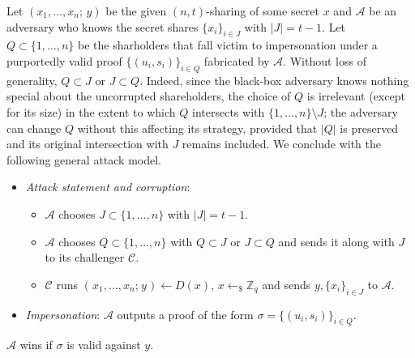 \documentclass[10pt, psamsfonts, reqno]{amsart}
\theoremstyle{definition}
\theoremstyle{remark}
\numberwithin{equation}{section}
\begin{document}
Let $(x_1, \dots, x_n;\hspace{2pt} y)$
be the given $(n, t)$-sharing of some secret $x$
and $\mathcal{A}$ be an adversary who knows
the secret shares
$\{x_i\}_{i \in J}$ with $|J| = t-1$.
Let $Q \subset \{1, \dots, n\}$ be the
sharholders that fall victim to impersonation
under a purportedly valid proof $\{(u_i, s_i)\}_{i \in Q}$
fabricated by $\mathcal{A}$.
Without loss of generality,
$Q \subset J$ or $J \subset Q$.
Indeed, since the black-box adversary knows nothing
special about the uncorrupted shareholders,
the choice of $Q$ is irrelevant
(except for its size) in the extent to which
$Q$ intersects with $\{1, \dots, n\} \setminus J$;
the adversary can change $Q$
without this affecting its strategy,
provided that $|Q|$ is preserved and
its original intersection with $J$ remains included.
We conclude with the following general attack model.
\begin{itemize}[label=$\bullet$,leftmargin=20pt,rightmargin=0pt]
	\vspace{4pt}
	\item
		\textit{Attack statement and corruption}:
			\begin{itemize}[
				label=$\circ$,leftmargin=17pt,rightmargin=21pt
			]
			\vspace{3pt}
			\item $\mathcal{A}$ chooses $J \subset \{1, \dots, n\}$
				with $|J| = t-1$.
				\vspace{3pt}
			\item $\mathcal{A}$ chooses $Q \subset \{1, \dots, n\}$
				with $Q \subset J$  or $J \subset Q$ and
				sends it along with $J$ to its challenger
				$\mathcal{C}$.
				\vspace{3pt}
			\item $\mathcal{C}$ runs
				$(\hspace{1pt}x_1, \dots, x_n;\hspace{1pt} y\hspace{1pt})
				\leftarrow D(x),\hspace{2pt} x \leftarrow_\$ \mathbb{Z}_q$
				and sends $y, \{x_i\}_{i \in J}$
				to $\mathcal{A}$.
			\vspace{3pt}
			\end{itemize}
	\item \textit{Impersonation}:
		$\mathcal{A}$ outputs a proof of the form
		$\sigma = \{(u_i, s_i)\}_{i \in Q}$.
\vspace{5pt}
\end{itemize}
\hspace*{5pt}%
\begin{minipage}{\dimexpr\textwidth-\parindent\relax}%
\hspace{0pt}
$\mathcal{A}$ wins if $\sigma$ is valid against $y$.
\vspace{5pt}
\end{minipage}%
\end{document}
